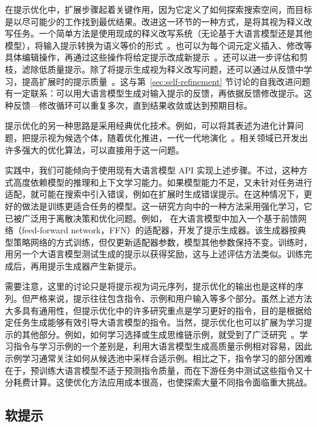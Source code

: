 在提示优化中，扩展步骤起着关键作用，因为它定义了如何探索搜索空间，而目标是以尽可能少的工作找到最优结果。改进这一环节的一种方式，是将其视为释义改写任务。一个简单方法是使用现成的释义改写系统（无论基于大语言模型还是其他模型），将输入提示转换为语义等价的形式~\cite{jiang-etal:2020can}。也可以为每个词元定义插入、修改等具体编辑操作，再通过这些操作将给定提示改成新提示~\cite{prasad-etal:2023grips}。还可以进一步评估和剪枝，滤除低质量提示。除了将提示生成视为释义改写问题，还可以通过从反馈中学习，提高扩展时的提示质量~\cite{pryzant-etal:2023automatic}。这与第~\ref{sec:self-refinement} 节讨论的自我改进问题有一定联系：可以用大语言模型生成对输入提示的反馈，再依据反馈修改提示。这种反馈—修改循环可以重复多次，直到结果收敛或达到预期目标。

提示优化的另一种思路是采用经典优化技术。例如，可以将其表述为进化计算问题，把提示视为候选个体，随着优化推进，一代一代地演化~\cite{guo-etal:2024connecting}。相关领域已开发出许多强大的优化算法，可以直接用于这一问题。

实践中，我们可能倾向于使用现有大语言模型 API 实现上述步骤。不过，这种方式高度依赖模型的推理和上下文学习能力。如果模型能力不足，又未针对任务进行适配，就可能在搜索中引入错误，例如在扩展时生成错误提示。在这种情况下，更好的做法是训练更适合任务的模型。这一研究方向中的一种方法采用强化学习，它已被广泛用于离散决策和优化问题。例如，\citet{deng-etal:2022rlprompt} 在大语言模型中加入一个基于前馈网络（feed-forward network，FFN）的适配器，开发了提示生成器。该生成器按典型策略网络的方式训练，但仅更新适配器参数，模型其他参数保持不变。训练时，用另一个大语言模型测试生成的提示以获得奖励，这与上述评估方法类似。训练完成后，再用提示生成器产生新提示。

需要注意，这里的讨论只是将提示视为词元序列，提示优化的输出也是这样的序列。但严格来说，提示往往包含指令、示例和用户输入等多个部分。虽然上述方法大多具有通用性，但提示优化中的许多研究重点是学习更好的指令，目的是根据给定任务生成能够有效引导大语言模型的指令。当然，提示优化也可以扩展为学习提示的其他部分。例如，如何学习选择或生成思维链示例，就受到了广泛研究~\cite{liu-etal:2022makes,rubin-etal:2022learning,zhang-etal:2023automatic}。学习指令与学习示例的一个差别是，利用大语言模型生成高质量示例相对容易，因此示例学习通常关注如何从候选池中采样合适示例。相比之下，指令学习的部分困难在于，预训练大语言模型不适于预测指令质量，而在下游任务中测试这些指令又十分耗费计算。这使优化方法应用成本很高，也使探索大量不同指令面临重大挑战。

\subsection{软提示}

